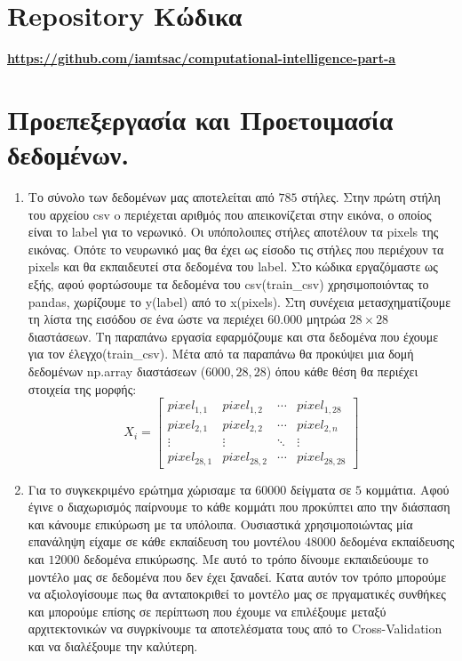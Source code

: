 \documentclass[12pt,a4paper]{article}
\author{Κωνσταντίνος Τσάκωνας}
\date{Ακαδημαϊκό έτος 2020-21\\ Χειμερινό Εξάμηνο}
\newcommand{\tl}{\textlatin}
\newcommand{\gr}{\selectlanguage{greek}}
\begin{document}
    \gr \maketitle \newpage

    \tableofcontents  \newpage

    \section{\tl{Repository} \gr Κώδικα}
        \underline{\tl{\textbf{\url{https://github.com/iamtsac/computational-intelligence-part-a}}}}

    \section{Προεπεξεργασία και Προετοιμασία δεδομένων.} 
    \begin{enumerate}
        \item 
        Το σύνολο των δεδομένων μας αποτελείται από $785$ στήλες. Στην πρώτη στήλη του αρχείου \tl{csv} o περιέχεται αριθμός που απεικονίζεται στην εικόνα, ο οποίος είναι το  \tl{label} για το νερωνικό. Οι υπόπολοιπες στήλες αποτέλουν τα \tl{pixels} της εικόνας. Οπότε το νευρωνικό μας θα έχει ως είσοδο τις στήλες που περιέχουν τα \tl{pixels} και θα εκπαιδευτεί στα δεδομένα του \tl{label}. Στο κώδικα εργαζόμαστε ως εξής, αφού φορτώσουμε τα δεδομένα του \tl{csv(train\_csv)} χρησιμοποιόντας το pandas, χωρίζουμε το \tl{y(label)} από το \tl{x(pixels)}. Στη συνέχεια μετασχηματίζουμε τη λίστα της εισόδου σε ένα ώστε να περιέχει $60.000$ μητρώα $28\times28$ διαστάσεων. Τη παραπάνω εργασία εφαρμόζουμε και στα δεδομένα που έχουμε για τον έλεγχο(\tl{train\_csv}). Μέτα από τα παραπάνω θα προκύψει μια δομή δεδομένων \tl{np.array} διαστάσεων ($6000,28,28$) όπου κάθε θέση θα περιέχει στοιχεία της μορφής:
        \begin{equation*}
        X_i = 
        \begin{bmatrix}
            pixel_{1,1} & pixel_{1,2} & \cdots & pixel_{1,28} \\
            pixel_{2,1} & pixel_{2,2} & \cdots & pixel_{2,n} \\
            \vdots      & \vdots      & \ddots & \vdots  \\
            pixel_{28,1} & pixel_{28,2} & \cdots & pixel_{28,28} 
        \end{bmatrix} 
        \end{equation*}
        \item Για το συγκεκριμένο ερώτημα χώρισαμε τα $60000$ δείγματα σε $5$ κομμάτια. Αφού έγινε ο διαχωρισμός παίρνουμε το κάθε κομμάτι που προκύπτει απο την διάσπαση και κάνουμε επικύρωση με τα υπόλοιπα. Ουσιαστικά χρησιμοποιώντας μία επανάληψη είχαμε σε κάθε εκπαίδευση του μοντέλου $48000$ δεδομένα εκπαίδευσης και $12000$ δεδομένα επικύρωσης. Με αυτό το τρόπο δίνουμε εκπαιδεύουμε το μοντέλο μας σε δεδομένα που δεν έχει ξαναδεί. Κατα αυτόν τον τρόπο μπορούμε να αξιολογίσουμε πως θα ανταποκριθεί το μοντέλο μας σε πργαματικές συνθήκες και μπορούμε επίσης σε περίπτωση που έχουμε να επιλέξουμε μεταξύ αρχιτεκτονικών να συγρκίνουμε τα αποτελέσματα τους από το \tl{Cross-Validation } και να διαλέξουμε την καλύτερη.
    \end{enumerate}
\end{document}
